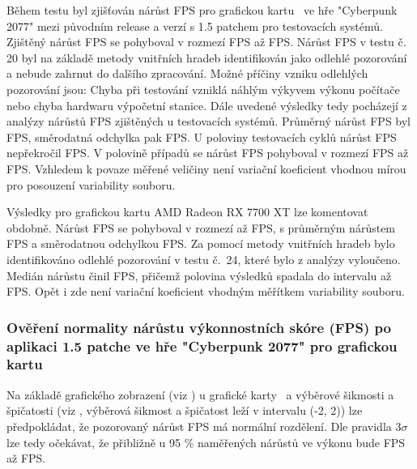 Během testu byl zjišťován nárůst FPS pro grafickou kartu \nvidiaCard\ ve hře "Cyberpunk 2077" mezi původním release a verzí s 1.5 patchem
pro  testovacích systémů. Zjištěný nárůst FPS se pohyboval v rozmezí  FPS
až  FPS. Nárůst FPS v testu č. 20 byl na základě metody vnitřních hradeb identifikován jako odlehlé pozorování
a nebude zahrnut do dalšího zpracování. Možné příčiny vzniku odlehlých pozorování jsou: Chyba při testování vzniklá náhlým výkyvem výkonu počítače
nebo chyba hardwaru výpočetní stanice. Dále uvedené výsledky tedy pocházejí z analýzy nárůstů FPS zjištěných u 
testovacích systémů. Průměrný nárůst FPS byl  FPS, směrodatná odchylka pak  FPS\@.
U poloviny testovacích cyklů nárůst FPS nepřekročil  FPS. V polovině případů se nárůst FPS pohyboval v
rozmezí  FPS až  FPS. Vzhledem k povaze měřené veličiny není variační koeficient vhodnou mírou
pro posouzení variability souboru.

\vspace{1em}
\noindent
Výsledky pro grafickou kartu AMD Radeon RX 7700 XT lze komentovat obdobně.
Nárůst FPS se pohyboval v rozmezí  až  FPS, s průměrným nárůstem  FPS a
směrodatnou odchylkou  FPS.\@
Za pomocí metody vnitřních hradeb bylo identifikováno odlehlé pozorování v testu č.\ 24, které bylo z analýzy vyloučeno.
Medián nárůstu činil  FPS, přičemž polovina výsledků spadala do intervalu  až  FPS.\@
Opět i zde není variační koeficient vhodným měřítkem variability souboru.

\subsubsection*{Ověření normality nárůstu výkonnostních skóre (FPS) po aplikaci 1.5 patche ve hře "Cyberpunk 2077" pro grafickou kartu \nvidiaCard}

Na základě grafického zobrazení (viz ) u grafické karty \nvidiaCard\ a výběrové šikmosti a špičatosti (viz ,
výběrová šikmost a špičatost leží v intervalu (-2, 2)) lze předpokládat, že pozorovaný nárůst FPS má normální rozdělení. Dle pravidla 3$\sigma$ lze tedy očekávat,
že přibližně u 95 \% naměřených nárůstů ve výkonu bude  FPS až  FPS\@.

